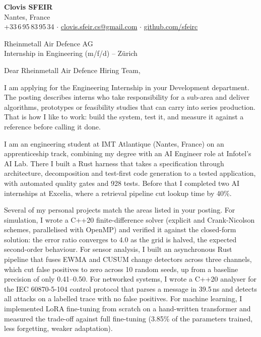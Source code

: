\documentclass[11pt]{article}
\begin{document}
\textbf{\large Clovis SFEIR} \\
Nantes, France \\
+33\,6\,95\,83\,95\,34 \;$\cdot$\; \href{mailto:clovis.sfeir.cs@gmail.com}{clovis.sfeir.cs@gmail.com} \;$\cdot$\; \href{https://github.com/sfeirc}{github.com/sfeirc}

\vspace{1.2em}
Rheinmetall Air Defence AG \\
Internship in Engineering (m/f/d) -- Z\"urich

\vspace{1.2em}
Dear Rheinmetall Air Defence Hiring Team,

I am applying for the Engineering Internship in your Development department. The posting describes interns who take responsibility for a sub-area and deliver algorithms, prototypes or feasibility studies that can carry into series production. That is how I like to work: build the system, test it, and measure it against a reference before calling it done.

I am an engineering student at IMT Atlantique (Nantes, France) on an apprenticeship track, combining my degree with an AI Engineer role at Infotel's AI Lab. There I built a Rust harness that takes a specification through architecture, decomposition and test-first code generation to a tested application, with automated quality gates and 928 tests. Before that I completed two AI internships at Excelia, where a retrieval pipeline cut lookup time by 40\%.

Several of my personal projects match the areas listed in your posting. For simulation, I wrote a C++20 finite-difference solver (explicit and Crank-Nicolson schemes, parallelised with OpenMP) and verified it against the closed-form solution: the error ratio converges to 4.0 as the grid is halved, the expected second-order behaviour. For sensor analysis, I built an asynchronous Rust pipeline that fuses EWMA and CUSUM change detectors across three channels, which cut false positives to zero across 10 random seeds, up from a baseline precision of only 0.41--0.50. For networked systems, I wrote a C++20 analyser for the IEC 60870-5-104 control protocol that parses a message in 39.5\,ns and detects all attacks on a labelled trace with no false positives. For machine learning, I implemented LoRA fine-tuning from scratch on a hand-written transformer and measured the trade-off against full fine-tuning (3.85\% of the parameters trained, less forgetting, weaker adaptation).
\end{document}

